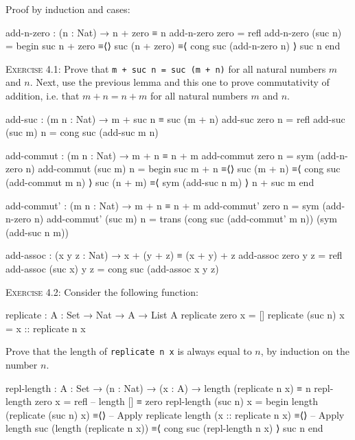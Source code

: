 \documentclass{article}
\begin{document}
\noindent
Proof by induction and cases:

\begin{code}
add-n-zero : (n : Nat) → n + zero ≡ n
add-n-zero zero = refl
add-n-zero (suc n) =
    begin
      suc n + zero
    ≡⟨⟩
      suc (n + zero)
    ≡⟨ cong suc (add-n-zero n) ⟩
      suc n
    end
\end{code}

\noindent
\textsc{Exercise 4.1}: Prove that \verb!m + suc n = suc (m + n)! for all natural numbers $m$ and $n$. Next, use the previous lemma and this one to prove commutativity of addition, i.e. that $m + n = n + m$ for all natural numbers $m$ and $n$.

\begin{code}
add-suc : (m n : Nat) → m + suc n ≡ suc (m + n)
add-suc zero n = refl
add-suc (suc m) n = cong suc (add-suc m n)

add-commut : (m n : Nat) → m + n ≡ n + m
add-commut zero n = sym (add-n-zero n)
add-commut (suc m) n =
    begin
      suc m + n
    ≡⟨⟩
      suc (m + n)
    ≡⟨ cong suc (add-commut m n) ⟩
      suc (n + m)
    ≡⟨ sym (add-suc n m) ⟩
      n + suc m
    end

add-commut' : (m n : Nat) → m + n ≡ n + m
add-commut' zero n = sym (add-n-zero n)
add-commut' (suc m) n =
    trans (cong suc (add-commut' m n)) (sym (add-suc n m))
\end{code}

\begin{code}
add-assoc : (x y z : Nat) → x + (y + z) ≡ (x + y) + z
add-assoc zero y z = refl
add-assoc (suc x) y z = cong suc (add-assoc x y z)
\end{code}

\noindent
\textsc{Exercise 4.2}: Consider the following function:
\begin{code}
replicate : {A : Set} → Nat → A → List A
replicate zero x = []
replicate (suc n) x = x :: replicate n x
\end{code}
Prove that the length of \verb!replicate n x! is always equal to $n$, by induction on the number $n$.

\begin{code}
repl-length : {A : Set} → (n : Nat) → (x : A) → length (replicate n x) ≡ n
repl-length zero x = refl -- length [] ≡ zero
repl-length (suc n) x =
    begin
      length (replicate (suc n) x)
    ≡⟨⟩ -- Apply replicate
      length (x :: replicate n x)
    ≡⟨⟩ -- Apply length
      suc (length (replicate n x))
    ≡⟨ cong suc (repl-length n x) ⟩
      suc n
    end
\end{code}
\end{document}
